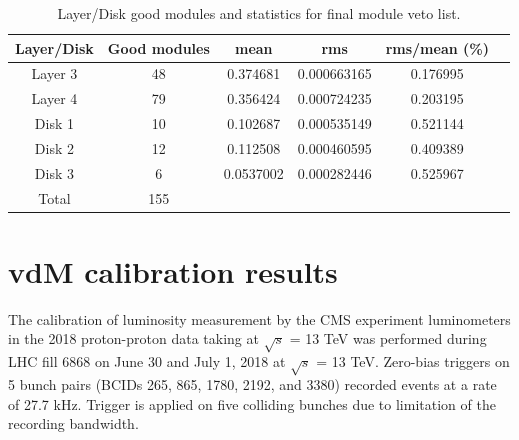 \begin{table}[!htp]
  \centering
  \caption[Final module veto statistics]{Layer/Disk good modules and statistics for final module veto list.}
\begin{tabular}{cccccc}
\textbf{Layer/Disk} & \textbf{Good modules} & \textbf{mean} & \textbf{rms} & \textbf{rms/mean} (\%) \\
\hline
Layer 3 & 48 & 0.374681 & 0.000663165 & 0.176995 \\
Layer 4 & 79 & 0.356424 & 0.000724235 & 0.203195 \\
Disk 1 & 10 & 0.102687 & 0.000535149 & 0.521144 \\
Disk 2 & 12 & 0.112508 & 0.000460595 & 0.409389 \\
Disk 3 & 6 & 0.0537002 & 0.000282446 & 0.525967 \\
Total  & 155 & & \\
\end{tabular}
\label{tab:layer-disk}
\end{table}

\section{vdM calibration results}

The calibration of luminosity measurement by the CMS experiment luminometers in the 2018 proton-proton data taking at $\sqrt{s}$ = 13 TeV \cite{pas_18} was performed during LHC fill 6868 on June 30 and July 1, 2018 at $\sqrt{s}$ = 13 TeV. Zero-bias triggers on 5 bunch pairs (BCIDs 265, 865, 1780, 2192, and 3380) recorded events at a rate of 27.7 kHz. Trigger is applied on five colliding bunches due to limitation of the recording bandwidth.

